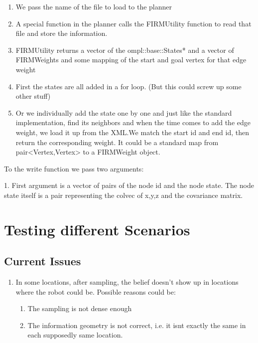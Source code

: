 \begin{enumerate}
 \item We pass the name of the file to load to the planner
 \item A special function in the planner calls the FIRMUtility function to read that file and store the information.
 \item FIRMUtility returns a vector of the ompl::base::States* and a vector of FIRMWeights and some mapping of the start and goal vertex for that edge weight
 \item First the states are all added in a for loop. (But this could screw up some other stuff)
 \item Or we individually add the state one by one and just like the standard implementation, find its neighbors and when the time comes to add the edge weight, we load it up from the 
       XML.We match the start id and end id, then return the corresponding weight. It could be a standard map from pair<Vertex,Vertex> to a FIRMWeight object.
\end{enumerate}

To the write function we pass two arguments:

1. First argument is a vector of pairs of the node id and the node state. The node state itself is a pair representing the colvec of x,y,z and the covariance matrix.


\section{Testing different Scenarios}

\subsection{Current Issues}

\begin{enumerate}
 \item In some locations, after sampling, the belief doesn't show up in locations where the robot could be. Possible reasons could be:
      \begin{enumerate}
       \item The sampling is not dense enough
       \item The information geometry is not correct, i.e. it isnt exactly the same in each supposedly same location.
      \end{enumerate}


\end{enumerate}


































